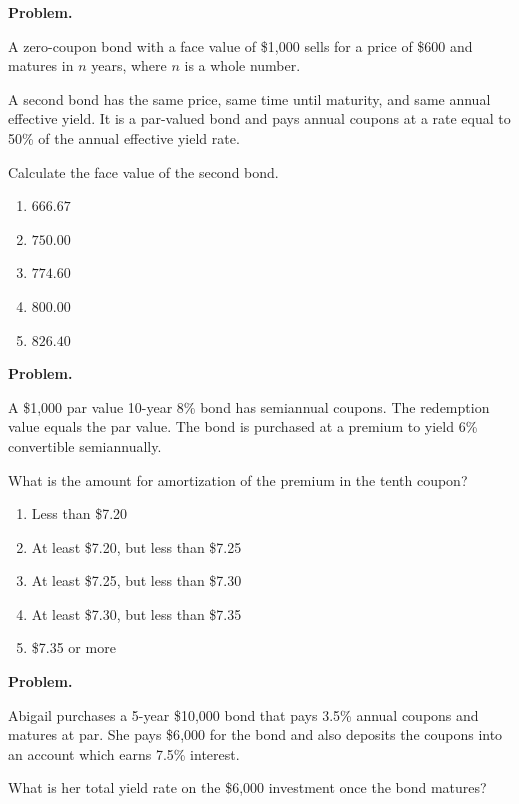 \documentclass[11pt]{article}
\begin{document}


\newpage

\textbf{Problem.}

A zero-coupon bond with a face value of \$1{,}000 sells for a price of \$600 and matures in $n$ years, where $n$ is a whole number.

A second bond has the same price, same time until maturity, and same annual effective yield. It is a par-valued bond and pays annual coupons at a rate equal to 50\% of the annual effective yield rate.

Calculate the face value of the second bond.

\begin{enumerate}[label=\Alph*.]
    \item $666.67$
    \item $750.00$
    \item $774.60$
    \item $800.00$
    \item $826.40$
\end{enumerate}

\newpage

\textbf{Problem.}

A \$1{,}000 par value 10-year 8\% bond has semiannual coupons. The redemption value equals the par value. The bond is purchased at a premium to yield 6\% convertible semiannually.

What is the amount for amortization of the premium in the tenth coupon?

\begin{enumerate}[label=\Alph*.]
    \item Less than \$7.20
    \item At least \$7.20, but less than \$7.25
    \item At least \$7.25, but less than \$7.30
    \item At least \$7.30, but less than \$7.35
    \item \$7.35 or more
\end{enumerate}

\newpage

\textbf{Problem.}

Abigail purchases a 5-year \$10{,}000 bond that pays 3.5\% annual coupons and matures at par. She pays \$6{,}000 for the bond and also deposits the coupons into an account which earns 7.5\% interest.

What is her total yield rate on the \$6{,}000 investment once the bond matures?
\end{document}
